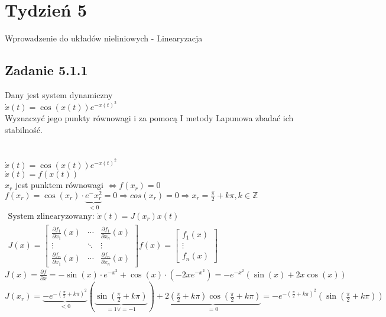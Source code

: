 \pagebreak
\section*{Tydzień 5}
Wprowadzenie do układów nieliniowych - Linearyzacja
\subsection*{Zadanie 5.1.1} {\color{darkgray}
	Dany jest system dynamiczny\\
	$\dot{x}(t)= \cos(x(t))e^{-x(t)^2}$\\
	Wyznaczyć jego punkty równowagi i za pomocą I metody Lapunowa zbadać ich stabilność.\\
}\lineh
\\\\
$\dot{x}(t)=\cos(x(t))e^{-x(t)^2}$\\
$\dot{x}(t)=f(x(t))$\\
$x_r$ jest punktem równowagi $ \Leftrightarrow f(x_r)=0$\\
$f(x_r)=\cos(x_r)\cdot \underbrace{e^-x_r^2}_{<0}=0 \Rightarrow cos(x_r)=0 \Rightarrow x_r=\frac{\pi}{2}+k\pi, k \in \mathbb{Z}$\\
$\boxed{\begin{aligned}
\text{System zlinearyzowany: } \dot{x}(t)=J(x_r)x(t)\\
J(x)=\left[ \begin{array}{ccc} 
 \frac{\partial f_1}{\partial x_1}(x) & \cdots &  \frac{\partial f_1}{\partial x_n}(x)\\
\vdots & \ddots & \vdots\\
\frac{\partial f_n}{\partial x_1}(x) &\cdots & \frac{\partial f_n}{\partial x_n}(x) 
  \end{array}\right] f(x)= \left[ \begin{array}{c}  f_1(x)   \\ \vdots \\ f_n(x)    \end{array}\right]
\end{aligned}}$\\
$J(x)=\frac{\partial f}{\partial x} = - \sin(x) \cdot e^{-x^2}+\cos(x) \cdot (-2xe^{-x^2})=-e^{-x^2}(\sin(x)+2x\cos(x))$\\
$J(x_r)=\underbrace{-e^{-(\frac{\pi}{2}+k\pi)^2}}_{<0}(\underbrace{\sin(\frac{\pi}{2}+k\pi)}_{=1 \vee =-1})+\underbrace{2(\frac{\pi}{2}+k\pi)\cos(\frac{\pi}{2}+k\pi)}_{=0}=-e^{-(\frac{\pi}{2}+k\pi)^2} (\sin(\frac{\pi}{2}+k\pi))$\\
